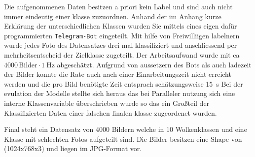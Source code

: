 Die aufgenommenen Daten besitzen a priori kein Label und sind auch nicht immer
eindeutig einer klasse zuzuordnen.
Anhand der im Anhang kurze Erklärung der unterschiedlichen Klassen wurden Sie
mittels eines eigen dafür programmierten \texttt{Telegram-Bot} eingeteilt.
Mit hilfe von Freiwilliigen labelnern wurde jedes Foto des Datensatzes drei mal
klassifiziert und anschliessend per mehrheitsentscheid der Zielklasse zugeteilt.
Der Arbeitsaufwand wurde mit ca $\num{4000} \, \text{Bilder} \cdot \SI{1}{\hertz}$
abgeschätzt.
Aufgrund von aussetzern des Bots als auch ladezeit der Bilder konnte die Rate
auch nach einer Einarbeitungszeit nicht erreicht werden und die pro Bild benötigte Zeit entsprach schätzungsweise
\SI{15}{\second}
Bei der evulation der Modelle stellte sich heraus das bei Paralleler nutzung
sich eine interne Klassenvariable überschrieben wurde so das ein Großteil der
Klassifizierten Daten einer falschen finalen klasse zugeordenet wurden. 

Final steht ein Datensatz von \num{4000} Bildern welche in 10 Wolkenklassen und
eine Klasse mit schlechten Fotos aufgeteilt sind. Die Bilder besitzen eine Shape
von (1024x768x3) und liegen im JPG-Format vor.
